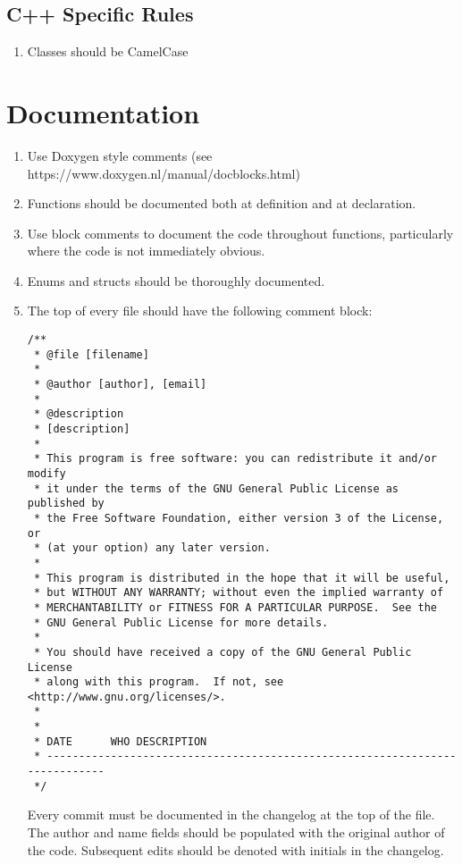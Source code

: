 \documentclass{article}
\begin{document}
\subsection{C++ Specific Rules}
\begin{enumerate}
    \item Classes should be CamelCase
\end{enumerate}
\section{Documentation}
\begin{enumerate}
    \item Use Doxygen style comments (see https://www.doxygen.nl/manual/docblocks.html)
    \item Functions should be documented both at definition and at declaration.
    \item Use block comments to document the code throughout functions, particularly where the code is not immediately obvious.
    \item Enums and structs should be thoroughly documented.
    \item The top of every file should have the following comment block:
\begin{lstlisting}
/**
 * @file [filename]
 *
 * @author [author], [email]
 * 
 * @description 
 * [description]
 *
 * This program is free software: you can redistribute it and/or modify
 * it under the terms of the GNU General Public License as published by
 * the Free Software Foundation, either version 3 of the License, or
 * (at your option) any later version.
 *
 * This program is distributed in the hope that it will be useful,
 * but WITHOUT ANY WARRANTY; without even the implied warranty of
 * MERCHANTABILITY or FITNESS FOR A PARTICULAR PURPOSE.  See the
 * GNU General Public License for more details.
 *
 * You should have received a copy of the GNU General Public License
 * along with this program.  If not, see <http://www.gnu.org/licenses/>.
 *
 *
 * DATE      WHO DESCRIPTION
 * ----------------------------------------------------------------------------
 */
\end{lstlisting}

    Every commit must be documented in the changelog at the top of the file.  The author and name fields should be populated with the original author of the code.  Subsequent edits should be denoted with initials in the changelog.

\end{enumerate}
\end{document}
